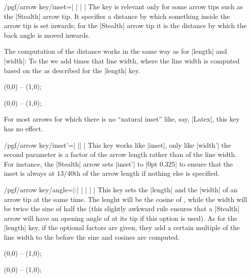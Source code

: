 \begin{key}{/pgf/arrow key/inset=| |%
    | |}
  The key is relevant only for some arrow tips such as the |Stealth|
  arrow tip. It specifies a distance by which something inside the
  arrow tip is set inwards; for the |Stealth| arrow tip it is the
  distance by which the back angle is moved inwards.

  The computation of the distance works in the same way as for
  |length| and |width|: To the  we add  times that line width, where the line width is
  computed based on the  as described for the
  |length| key.
\begin{codeexample}[]
\tikz \draw [arrows = {-Stealth[length=10pt, inset=5pt]}] (0,0) -- (1,0);
\end{codeexample}
\begin{codeexample}[]
\tikz \draw [arrows = {-Stealth[length=10pt, inset=2pt]}] (0,0) -- (1,0);
\end{codeexample}

  For most arrows for which there is no ``natural inset'' like, say,
  |Latex|, this key has no effect.
\end{key}


\begin{key}{/pgf/arrow key/inset'=| || |}
  This key works like |inset|, only like |width'| the second parameter
  is a factor of the arrow length rather than of the line width. For
  instance, the |Stealth| arrow sets |inset'| to |0pt 0.325| to ensure
  that the inset is always at $13/40$th of the arrow length if nothing
  else is specified.
\end{key}



\begin{key}{/pgf/arrow key/angle=|:|%
    | |%
    | |}
  This key sets the |length| and the |width| of an arrow tip at the
  same time. The lenght will be the cosine of , while the
  width will be twice the sine of half the  (this slightly
  awkward rule ensures that a |Stealth| arrow will have an opening
  angle of  at its tip if this option is used). As for the
  |length| key, if the optional factors are given, they add a certain
  multiple of the line width to the  before the sine
  and cosines are computed.
\begin{codeexample}[]
\tikz \draw [arrows = {-Stealth[inset=0pt, angle=90:10pt]}] (0,0) -- (1,0);
\end{codeexample}
\begin{codeexample}[]
\tikz \draw [arrows = {-Stealth[inset=0pt, angle=30:10pt]}] (0,0) -- (1,0);
\end{codeexample}
\end{key}


